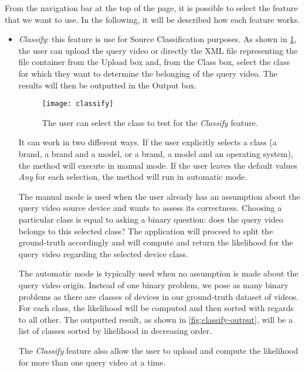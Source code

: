 From the navigation bar at the top of the page, it is possible to select the feature that we want to use. In the following, it will be described how each feature works.

\begin{itemize}

\item \emph{Classify}: this feature is use for Source Classification purposes. As shown in \ref{fig:classify}, the user can upload the query video or directly the XML file representing the file container from the Upload box and, from the Class box, select the class for which they want to determine the belonging of the query video. The results will then be outputted in the Output box. 

\begin{figure}
  \centering
  \texttt{[image: classify]}
  \caption{The user can select the class to test for the \emph{Classify} feature.}\label{fig:classify}
\end{figure}

It can work in two different ways. If the user explicitly selects a class (a brand, a brand and a model, or a brand, a model and an operating system), the method will execute in manual mode. If the user leaves the default values \emph{Any} for each selection, the method will run in automatic mode.

The manual mode is used when the user already has an assumption about the query video source device and wants to assess its correctness. Choosing a particular class is equal to asking a binary question: does the query video belongs to this selected class? The application will proceed to split the ground-truth accordingly and will compute and return the likelihood for the query video regarding the selected device class.

The automatic mode is typically used when no assumption is made about the query video origin. Instead of one binary problem, we pose as many binary problems as there are classes of devices in our ground-truth dataset of videos. For each class, the likelihood will be computed and then sorted with regards to all other. The outputted result, as shown in \ref{fig:classify-output}, will be a list of classes sorted by likelihood in decreasing order.

The \emph{Classify} feature also allow the user to upload and compute the likelihood for more than one query video at a time.


\end{itemize}
